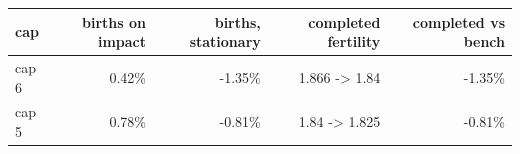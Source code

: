 \begin{tabular}{lrrrr}
\toprule
cap & births on impact & births, stationary & completed fertility & completed vs bench \\
\midrule
cap 6 & 0.42\% & -1.35\% & 1.866 -> 1.84 & -1.35\% \\
cap 5 & 0.78\% & -0.81\% & 1.84 -> 1.825 & -0.81\% \\
\bottomrule
\end{tabular}
